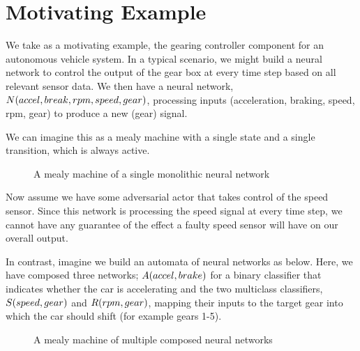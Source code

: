 \section{Motivating Example}

We take as a motivating example, the gearing controller component for an autonomous vehicle system.
In a typical scenario, we might build a neural network to control the output of the gear box at every time step based on all relevant sensor data.
We then have a neural network, $N(accel,break,rpm,speed,gear)$, processing inputs (acceleration, braking, speed, rpm, gear) to produce a new (gear) signal.

We can imagine this as a mealy machine with a single state and a single transition, which is always active.

\begin{figure}[h!]
\centering
{}
\caption{A mealy machine of a single monolithic neural network}
\label{fig:full}
\end{figure}

Now assume we have some adversarial actor that takes control of the speed sensor.
Since this network is processing the speed signal at every time step, we cannot have any guarantee of the effect a faulty speed sensor will have on our overall output.

In contrast, imagine we build an automata of neural networks as below.
Here, we have composed three networks; $A(accel,brake)$ for a binary classifier that indicates whether the car is accelerating and the two multiclass classifiers, $S(speed,gear)$ and $R(rpm,gear)$, mapping their inputs to the target gear into which the car should shift (for example gears 1-5).

\begin{figure}[h!]
\centering
{}
\caption{A mealy machine of multiple composed neural networks}
\label{fig:components}
\end{figure}


